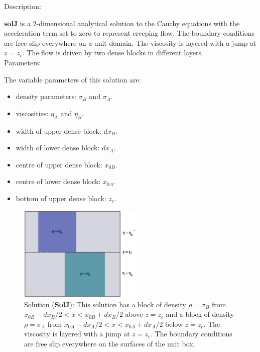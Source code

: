   {\large \fontB Description:}
  
  {\bf solJ} is a 2-dimensional analytical solution to the Cauchy equations with the acceleration term set to zero
  to represent creeping flow. The boundary conditions are free-slip everywhere on a unit domain. 
  The viscosity is layered with a jump at $ z=z_c $.
  The flow is driven by two dense blocks in different layers.
  \\

  {\large \fontB Parameters:}
 
  The variable parameters of this solution are:
  \begin{itemize}
    \item{density parameters: $ \sigma_B $ and $ \sigma_A $.}
    \item{viscosities: $\eta_A$ and $\eta_B$.}
    \item{width of upper dense block: $dx_B$.}
    \item{width of lower dense block: $dx_A$.}
    \item{centre of upper dense block: $x_{0B}$.}
    \item{centre of lower dense block: $x_{0A}$.}
    \item{bottom of upper dense block: $z_c$.}
    \end{itemize}

  \begin{figure}
    \includegraphics[width=6cm,clip]{../figs/figJ.eps}
    \caption[Short caption]{\label{figJ} 
      Solution ({\bf SolJ}):
      This solution has a block of density $\rho = \sigma_B$ from $x_{0B}-dx_B/2 < x < x_{0B}+dx_B/2$ above
      $ z= z_c$ and a block of density $\rho = \sigma_A$ from $x_{0A}-dx_A/2 < x < x_{0A}+dx_A/2$ below
      $ z= z_c$.
      The viscosity is layered with a jump at $ z=z_c $.
      The boundary conditions are free slip everywhere on the surfaces of the unit box.}
  \end{figure} 
  

